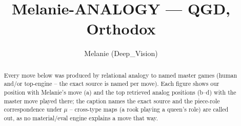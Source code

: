 \documentclass[11pt]{article}
\title{Melanie-ANALOGY — QGD, Orthodox}
\author{Melanie (Deep\_Vision)}
\date{}
\begin{document}
\maketitle

\begin{abstract}Every move below was produced by relational analogy to named master games (human and/or top-engine -- the exact source is named per move). Each figure shows our position with Melanie's move (a) and the top retrieved analog positions (b--d) with the master move played there; the caption names the exact source and the piece-role correspondence under $\mu$ -- cross-type maps (a rook playing a queen's role) are called out, as no material/eval engine explains a move that way.\end{abstract}

\begin{figure}[p]\centering
\begin{subfigure}{0.46\textwidth}\centering
\resizebox{\linewidth}{!}{%
\newchessgame
\chessboard[
  setfen={rnbq1rk1/ppp1bpp1/4pB1p/3p4/2PP4/2N1PN2/PP3PPP/R2QKB1R b KQ - 0 7},
  showmover=false,
  pgfstyle=straightmove, color=movearrow, markmove={e7-f6}
]}
\caption{}
\end{subfigure}\hfill
\begin{subfigure}{0.46\textwidth}\centering
\resizebox{\linewidth}{!}{%
\newchessgame
\chessboard[
  setfen={rnbq1rk1/ppp1bpp1/4pB1p/3p4/2PP4/2N1PN2/PP3PPP/R2QKB1R b KQ - 0 7},
  showmover=false,
  pgfstyle=straightmove, color=movearrow, markmove={e7-f6}
]}
\caption{}
\end{subfigure}
\\[4pt]
\begin{subfigure}{0.46\textwidth}\centering
\resizebox{\linewidth}{!}{%
\newchessgame
\chessboard[
  setfen={rnbq1rk1/ppp1bpp1/4pB1p/3p4/2PP4/2N1PN2/PP3PPP/R2QKB1R b KQ - 0 7},
  showmover=false,
  pgfstyle=straightmove, color=movearrow, markmove={e7-f6}
]}
\caption{}
\end{subfigure}\hfill
\begin{subfigure}{0.46\textwidth}\centering
\resizebox{\linewidth}{!}{%
\newchessgame
\chessboard[
  setfen={rnbq1rk1/ppp1bpp1/4pB1p/3p4/2PP4/2N1PN2/PP3PPP/R2QKB1R b KQ - 0 7},
  showmover=false,
  pgfstyle=straightmove, color=movearrow, markmove={e7-f6}
]}
\caption{}
\end{subfigure}

\end{figure}
\end{document}
